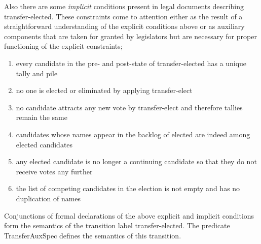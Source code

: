 \documentclass[10pt,conference]{IEEEtran}
\begin{document}
Also there are some \emph{implicit} conditions present in legal documents describing transfer-elected. These constraints come to attention either as the result of a straightforward understanding of the explicit conditions above or as   auxiliary components that are taken for granted by legislators but are
necessary for proper functioning of the explicit constraints;
\begin{enumerate}
\item every candidate in the pre- and post-state of transfer-elected has a unique tally and pile
\item no one is elected or eliminated by applying transfer-elect
\item no candidate attracts any new vote by transfer-elect and therefore tallies remain the same
\item candidates whose names appear in the backlog of elected are indeed among elected candidates
\item any elected candidate is no longer a continuing candidate so that they do not receive votes any further
\item the list of competing candidates in the election is not empty and has no duplication of names
\end{enumerate}  
Conjunctions of formal declarations of the above explicit and implicit conditions form the semantics of the transition label transfer-elected.   The predicate TransferAuxSpec defines the semantics of this transition.
\end{document}
